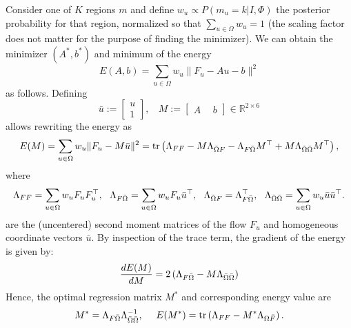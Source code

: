 Consider one of $K$ regions $m$ and define $w_u \propto P(m_u=k|I,\Phi)$ the posterior probability for that region, normalized so that $\sum_{u\in\Omega} w_u = 1$ (the scaling factor does not matter for the purpose of finding the minimizer).
We can obtain the minimizer $(A^*,b^*)$ and minimum of the energy
\begin{equation}\label{e:energy}
E(A,b)
=
\sum_{u \in \Omega} w_u \|F_u - Au-b\|^2
\end{equation}
as follows.
Defining
$$
\bar u := \begin{bmatrix} u \\ 1 \end{bmatrix},
~~~~
M := \begin{bmatrix} A & ~~b \end{bmatrix} \in \mathbb{R}^{2\times 6}
$$
allows rewriting the energy as
$$
E(M)
=
\sum_{u \in \Omega} w_u \|F_u - M \bar u\|^2
=
\operatorname{tr}\left(
\Lambda_{FF} 
- M \Lambda_{\bar \Omega F} 
- \Lambda_{F \bar \Omega} M^\top 
+ M \Lambda_{\bar \Omega \bar \Omega} M^\top
\right)  ,
$$
where
$$
\Lambda_{FF} = \sum_{u \in \Omega} w_u F_uF_u^\top,~~
\Lambda_{F\bar \Omega} = \sum_{u \in \Omega} w_u F_u\bar u^\top,~~
\Lambda_{\bar \Omega F} = \Lambda_{F\bar \Omega}^\top,~~
\Lambda_{\bar \Omega \bar \Omega} = \sum_{u \in \Omega} w_u \bar u \bar u^\top.
$$
are the (uncentered) second moment matrices of the flow $F_u$ and homogeneous coordinate vectors $\bar u$.
By inspection of the trace term, the gradient of the energy is given by:
$$
\frac{dE(M)}{dM}
=
2\left(
\Lambda_{F \bar\Omega}
-
M \Lambda_{\bar\Omega \bar\Omega}
\right)
$$
Hence, the optimal regression matrix $M^*$ and corresponding energy value are
$$
M^* = \Lambda_{F \bar \Omega} \Lambda_{\bar \Omega \bar \Omega}^{-1},~~~~
E(M^*) = \operatorname{tr}\left(
\Lambda_{FF} 
- M^* \Lambda_{\Omega \bar F}
\right).
$$

